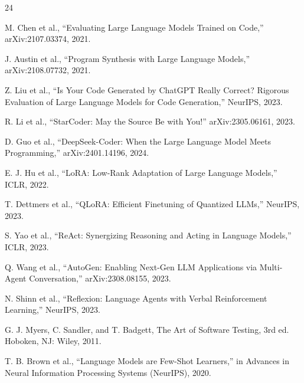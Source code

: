 \begin{thebibliography}{24}

 M. Chen et al., ``Evaluating Large Language Models Trained on Code,'' arXiv:2107.03374, 2021.

 J. Austin et al., ``Program Synthesis with Large Language Models,'' arXiv:2108.07732, 2021.

 Z. Liu et al., ``Is Your Code Generated by ChatGPT Really Correct? Rigorous Evaluation of Large Language Models for Code Generation,'' NeurIPS, 2023.

 R. Li et al., ``StarCoder: May the Source Be with You!'' arXiv:2305.06161, 2023.

 D. Guo et al., ``DeepSeek-Coder: When the Large Language Model Meets Programming,'' arXiv:2401.14196, 2024.

 E. J. Hu et al., ``LoRA: Low-Rank Adaptation of Large Language Models,'' ICLR, 2022.

 T. Dettmers et al., ``QLoRA: Efficient Finetuning of Quantized LLMs,'' NeurIPS, 2023.

 S. Yao et al., ``ReAct: Synergizing Reasoning and Acting in Language Models,'' ICLR, 2023.

 Q. Wang et al., ``AutoGen: Enabling Next-Gen LLM Applications via Multi-Agent Conversation,'' arXiv:2308.08155, 2023.

 N. Shinn et al., ``Reflexion: Language Agents with Verbal Reinforcement Learning,'' NeurIPS, 2023.

 G. J. Myers, C. Sandler, and T. Badgett, The Art of Software Testing, 3rd ed. Hoboken, NJ: Wiley, 2011.

 T. B. Brown et al., ``Language Models are Few-Shot Learners,'' in Advances in Neural Information Processing Systems (NeurIPS), 2020.


\end{thebibliography}
